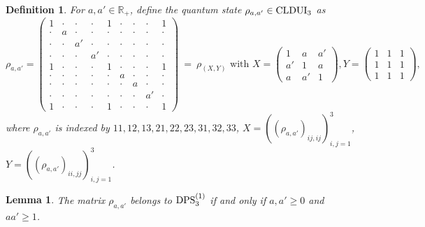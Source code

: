 \documentclass[11pt]{article}
\newcommand{\R}{\ensuremath{\mathbb{R}}}   %
\newcommand{\CLDUI}{\text{\rm CLDUI}}
\newcommand{\DPS}{\text{\rm DPS}}
\theoremstyle{plain}
\newtheorem{lemma}[satz]{Lemma}
\newtheorem{definition}[satz]{Definition}
\begin{document}
\begin{definition}\label{def:rhoaap}
For $a,a'\in\R_+$, define the quantum state $\rho_{a,a'}\in\CLDUI_3$ as
$$        \rho_{a,a'}=
  \left(  \begin{array}{ccc|ccc|ccc}
              1 & \cdot & \cdot & \cdot & 1 & \cdot & \cdot & \cdot & 1\\
          \cdot & a & \cdot & \cdot & \cdot & \cdot & \cdot & \cdot & \cdot\\
          \cdot & \cdot & a' & \cdot & \cdot & \cdot & \cdot & \cdot & \cdot\\
          \hline 
          \cdot & \cdot & \cdot & a' & \cdot & \cdot & \cdot & \cdot & \cdot\\
          1 & \cdot & \cdot & \cdot & 1 & \cdot & \cdot & \cdot & 1\\
          \cdot & \cdot & \cdot & \cdot & \cdot & a & \cdot & \cdot & \cdot\\
          \hline
          \cdot & \cdot & \cdot & \cdot & \cdot & \cdot & a & \cdot & \cdot\\
          \cdot & \cdot & \cdot & \cdot & \cdot & \cdot & \cdot & a' & \cdot\\
          1 & \cdot & \cdot & \cdot & 1 & \cdot & \cdot & \cdot & 1
     \end{array}
    \right)\ = \ \rho_{(X,Y)}  \text { with } 
     X=\begin{pmatrix}
            1&a&a'\\
            a'&1&a\\
            a&a'&1
        \end{pmatrix},
        Y=\begin{pmatrix}
            1&1&1\\
            1&1&1\\
            1&1&1
        \end{pmatrix},
            $$
where $\rho_{a,a'}$ is indexed by $11,12,13,21,22,23,31,32,33$, $X=((\rho_{a,a'})_{ij,ij})_{i,j=1}^3$,  $Y=((\rho_{a,a'})_{ii,jj})_{i,j=1}^3$.
\end{definition}

\begin{lemma}\label{lem:rhoaaDPS1}
    The matrix $\rho_{a,a'}$ belongs to $\DPS^{(1)}_3$ if and only if $a,a'\geq0$ and $a a'\geq1$.
\end{lemma}
\end{document}
